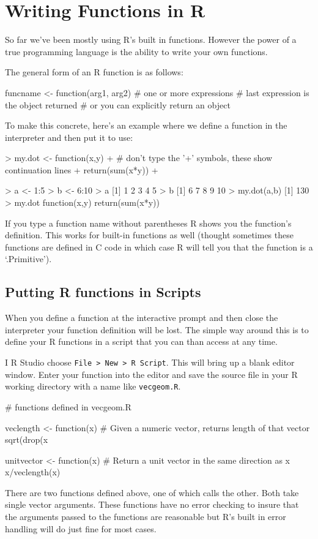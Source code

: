 
\section{Writing Functions in R}

So far we've been mostly using R's built in functions. However the power of a
true programming language is the ability to write your own functions.

The general form of an R function is as follows:

\begin{R}
funcname <- function(arg1, arg2) {
 # one or more expressions
 # last expression is the object returned
 # or you can explicitly return an object
}
\end{R}
To make this concrete, here's an example where we define a function in
the interpreter and then put it to use:
%
\begin{R}
> my.dot <- function(x,y){
+ # don't type the '+' symbols, these show continuation lines
+   return(sum(x*y))
+ }

> a <- 1:5
> b <- 6:10
> a
[1] 1 2 3 4 5
> b
[1]  6  7  8  9 10
> my.dot(a,b)
[1] 130
> my.dot
function(x,y){
  return(sum(x*y))
}
\end{R}
%
If you type a function name without parentheses R shows you the
function's definition. This works for built-in functions as well
(thought sometimes these functions are defined in C code in which case R
will tell you that the function is a `.Primitive').

\subsection{Putting R functions in Scripts}

When you define a function at the interactive prompt and then close the
interpreter your function definition will be lost. The simple way around
this is to define your R functions in a script that you can than access
at any time.

I R Studio choose \lstinline!File > New > R Script!. This
will bring up a blank editor window. Enter your function into the editor
and save the source file in your R working directory with a name like
\lstinline!vecgeom.R!.

\begin{R}
# functions defined in vecgeom.R

veclength <- function(x) {
  # Given a numeric vector, returns length of that vector
  sqrt(drop(x %
}

unitvector <- function(x) {
  # Return a unit vector in the same direction as x
  x/veclength(x)
}

\end{R}
There are two functions defined above, one of which calls the other. Both take single vector arguments. These functions have no error checking to insure that the arguments passed to the functions are reasonable but R's built in error handling will do just fine for most cases.


